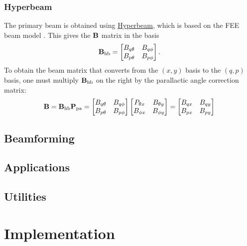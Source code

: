 \documentclass{book}
\newcommand{\pamat}{\ensuremath{{\bf P}_\text{pa}}}
\begin{document}
\subsection{Hyperbeam}
\label{sec:hyperbeam}

The primary beam is obtained using \href{https://github.com/MWATelescope/mwa_hyperbeam}{Hyperbeam}, which is based on the FEE beam model \citep{Sokolowski2017}.
This gives the ${\bf B}$ matrix in the basis
\begin{equation}
    {\bf B}_\text{hb} = \begin{bmatrix} B_{q\theta} & B_{q\phi} \\ B_{p\theta} & B_{p\phi} \end{bmatrix}.
\end{equation}
To obtain the beam matrix that converts from the $(x,y)$ basis to the $(q,p)$ basis, one must multiply ${\bf B}_\text{hb}$ on the right by the parallactic angle correction matrix:
\begin{equation}
    {\bf B} = {\bf B}_\text{hb}\pamat
            = \begin{bmatrix} B_{q\theta} & B_{q\phi} \\ B_{p\theta} & B_{p\phi} \end{bmatrix}
              \begin{bmatrix} P_{\theta x} & B_{\theta y} \\ B_{\phi x} & B_{\phi y} \end{bmatrix}
            = \begin{bmatrix} B_{qx} & B_{qy} \\ B_{px} & B_{py} \end{bmatrix}
\end{equation}

\section{Beamforming}

\section{Applications}

\section{Utilities}

\chapter{Implementation}
\end{document}
